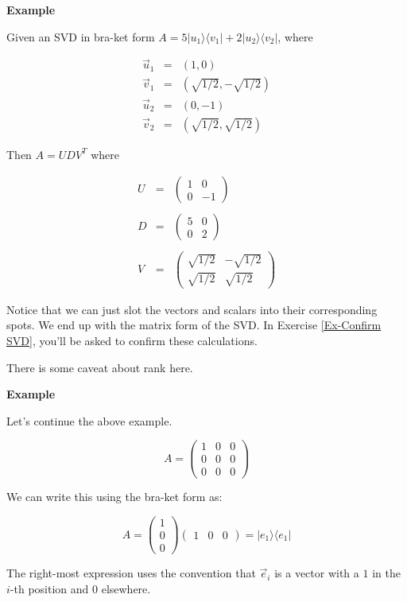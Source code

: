 \documentclass{amsbook}
\begin{document}
\begin{tcolorbox}[title=Example,colback=blue!5]
{\bfseries\Large Example}

Given an SVD in bra-ket form $A=5|u_1\rangle\langle v_1|+2|u_2\rangle\langle v_2|$, where

$$
\begin{array}{rcl}
\vec u_1 &=& (1, 0) \\
\vec v_1 &=& (\sqrt{1/2}, -\sqrt{1/2}) \\
\vec u_2 &=& (0, -1) \\
\vec v_2 &=& (\sqrt{1/2}, \sqrt{1/2})
\end{array}
$$

Then $A=UDV^T$ where

$$
\begin{array}{rcl}
U &=& \left(
\begin{array}{cc}
1 & 0 \\
0 & -1
\end{array}
\right)\\
\\
D&=&\left(
\begin{array}{ccc}
5 & 0 \\
0 & 2
\end{array}
\right)\\
\\
V&=&\left(
\begin{array}{ccc}
\sqrt{1/2} & -\sqrt{1/2} \\
\sqrt{1/2} & \sqrt{1/2}
\end{array}
\right)
\end{array}
$$

Notice that we can just slot the vectors and scalars into their corresponding spots.  We end up with the matrix form of the SVD.  In Exercise \ref{Ex-Confirm SVD}, you'll be asked to confirm these calculations.
\end{tcolorbox}

There is some caveat about rank here.

\begin{tcolorbox}[title=Example,colback=blue!5]
{\bfseries\Large Example}

Let's continue the above example.

$$
A=\left(\begin{array}{ccc}1&0&0\\0&0&0\\0&0&0\end{array}\right)
$$

We can write this using the bra-ket form as:

$$
A=\left(\begin{array}{c}1\\0\\0\end{array}\right)\left(\begin{array}{ccc}1&0&0\end{array}\right) = |e_1\rangle\langle e_1|
$$

The right-most expression uses the convention that $\vec e_i$ is a vector with a $1$ in the $i$-th position and $0$ elsewhere.
\end{tcolorbox}
\end{document}
